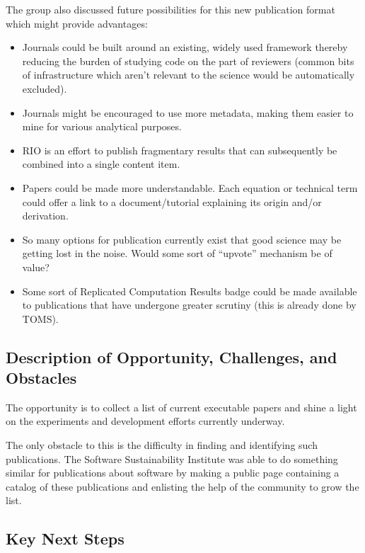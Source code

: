 The group also discussed future possibilities for this new publication format which might
provide advantages:
\begin{itemize}

\item Journals could be built around an existing, widely used framework thereby
reducing the burden of studying code on the part of reviewers (common bits of
infrastructure which aren't relevant to the science would be automatically
excluded).

\item Journals might be encouraged to use more metadata, making them easier to
mine for various analytical purposes.

\item RIO is an effort to publish fragmentary results that can subsequently be
combined into a single content item.

\item Papers could be made more understandable. Each equation or technical term
could offer a link to a document/tutorial explaining its origin and/or
derivation.

\item So many options for publication currently exist that good science may be
getting lost in the noise. Would some sort of ``upvote'' mechanism be of value?

\item Some sort of Replicated Computation Results badge could be made available
to publications that have undergone greater scrutiny (this is already done by
TOMS).
  
\end{itemize}

\subsection{Description of Opportunity, Challenges, and Obstacles}

The opportunity is to collect a list of current executable papers and shine a
light on the experiments and development efforts currently underway.

The only obstacle to this is the difficulty in finding and identifying such
publications. The Software Sustainability Institute was able to do something
similar for publications about software by making a public page containing a
catalog of these publications and enlisting the help of the community to grow
the list.

\subsection{Key Next Steps}

